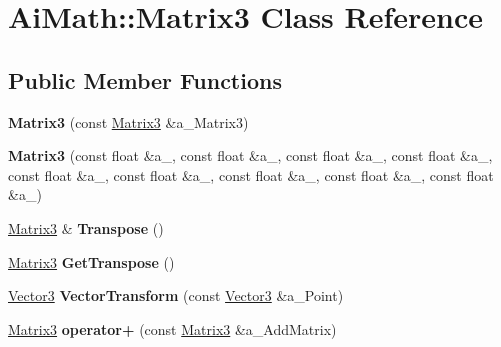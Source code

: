 \hypertarget{class_ai_math_1_1_matrix3}{\section{Ai\+Math\+:\+:Matrix3 Class Reference}
\label{class_ai_math_1_1_matrix3}
}
\subsection*{Public Member Functions}
\begin{DoxyCompactItemize}
\item 
\hypertarget{class_ai_math_1_1_matrix3_a67afe7995f6d9d8c5c1c76371032ea69}{{\bfseries Matrix3} (const \hyperlink{class_ai_math_1_1_matrix3}{Matrix3} \&a\+\_\+\+Matrix3)}\label{class_ai_math_1_1_matrix3_a67afe7995f6d9d8c5c1c76371032ea69}

\item 
\hypertarget{class_ai_math_1_1_matrix3_a993b32f4adb46c9572f12b092372d0b2}{{\bfseries Matrix3} (const float \&a\+\_, const float \&a\+\_, const float \&a\+\_, const float \&a\+\_, const float \&a\+\_, const float \&a\+\_, const float \&a\+\_, const float \&a\+\_, const float \&a\+\_)}\label{class_ai_math_1_1_matrix3_a993b32f4adb46c9572f12b092372d0b2}

\item 
\hypertarget{class_ai_math_1_1_matrix3_af03b471201fcacacffdb1373fdd1efb8}{\hyperlink{class_ai_math_1_1_matrix3}{Matrix3} \& {\bfseries Transpose} ()}\label{class_ai_math_1_1_matrix3_af03b471201fcacacffdb1373fdd1efb8}

\item 
\hypertarget{class_ai_math_1_1_matrix3_a44f8be1f91bf95afcf5c18d12a8ede7e}{\hyperlink{class_ai_math_1_1_matrix3}{Matrix3} {\bfseries Get\+Transpose} ()}\label{class_ai_math_1_1_matrix3_a44f8be1f91bf95afcf5c18d12a8ede7e}

\item 
\hypertarget{class_ai_math_1_1_matrix3_a3f188cf91a55d23b05a18cc0ccbf767d}{\hyperlink{class_ai_math_1_1_vector3}{Vector3} {\bfseries Vector\+Transform} (const \hyperlink{class_ai_math_1_1_vector3}{Vector3} \&a\+\_\+\+Point)}\label{class_ai_math_1_1_matrix3_a3f188cf91a55d23b05a18cc0ccbf767d}

\item 
\hypertarget{class_ai_math_1_1_matrix3_a2f9b8719344dafdcfacdf67e36c3b8bf}{\hyperlink{class_ai_math_1_1_matrix3}{Matrix3} {\bfseries operator+} (const \hyperlink{class_ai_math_1_1_matrix3}{Matrix3} \&a\+\_\+\+Add\+Matrix)}\label{class_ai_math_1_1_matrix3_a2f9b8719344dafdcfacdf67e36c3b8bf}


\end{DoxyCompactItemize}
